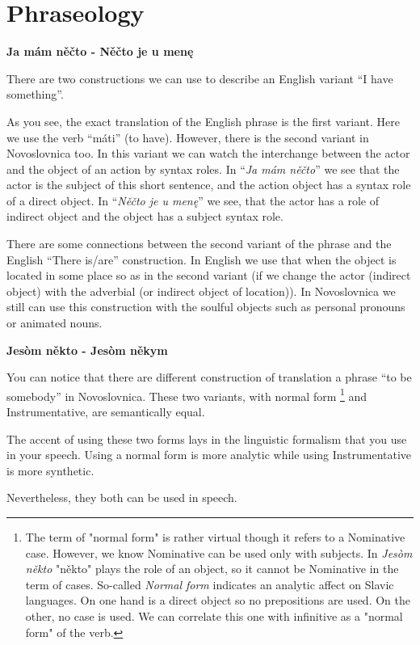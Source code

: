 \section{Phraseology}

\textbf{Ja mám něčto - Něčto je u menę}

There are two constructions we can use to describe an English variant “I have something”.

As you see, the exact translation of the English phrase is the first variant. Here we use the verb “máti” (to have). However, there is the second variant in Novoslovnica too. In this variant we can watch the interchange between the actor and the object of an action by syntax roles. In “\textit{Ja mám něčto}” we see that the actor is the subject of this short sentence, and the action object has a syntax role of a direct object. In “\textit{Něčto je u menę}” we see, that the actor has a role of indirect object and the object has a subject syntax role.    

There are some connections between the second variant of the phrase and the English “There is/are” construction. In English we use that when the object is located in some place so as in the second variant (if we change the actor (indirect object) with the adverbial (or indirect object of location)). In Novoslovnica we still can use this construction with the soulful objects such as personal pronouns or animated nouns. 

\textbf{Jesòm někto - Jesòm někym}

You can notice that there are different construction of translation a phrase “to be somebody” in Novoslovnica. These two variants, with normal form \footnote{The term of "normal form" is rather virtual though it refers to a Nominative case. However, we know Nominative can be used only with subjects. In \textit{Jesòm někto} "někto" plays the role of an object, so it cannot be Nominative in the term of cases. So-called \textit{Normal form} indicates an analytic affect on Slavic languages. On one hand is a direct object so no prepositions are used. On the other, no case is used. We can correlate this one with infinitive as a "normal form" of the verb.} and Instrumentative, are semantically equal. 

The accent of using these two forms lays in the linguistic formalism that you use in your speech. Using a normal form is more analytic while using Instrumentative is more synthetic.

Nevertheless, they both can be used in speech.
